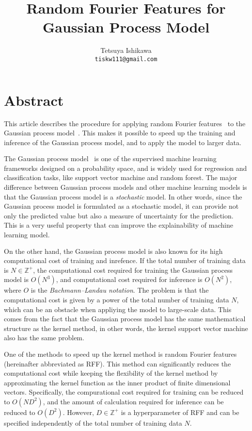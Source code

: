 \documentclass[twocolumn, a4paper, 10pt]{article}
\begin{document}
\title{Random Fourier Features for Gaussian Process Model}
\author{Tetsuya Ishikawa \\ \normalsize\texttt{tiskw111@gmail.com}}
\maketitle

\section*{Abstract}\titlebar

This article describes the procedure for applying random Fourier features~\cite{Rasmussen2006}
to the Gaussian process model~\cite{Rahimi2007}. This makes it possible to speed up the training
and inference of the Gaussian process model, and to apply the model to larger data.

The Gaussian process model~\cite{Rahimi2007} is one of the supervised machine learning frameworks
designed on a probability space, and is widely used for regression and classification tasks, like
support vector machine and random forest. The major difference between Gaussian process models and
other machine learning models is that the Gaussian process model is a \textit{stochastic} model.
In other words, since the Gaussian process model is formulated as a stochastic model,
it can provide not only the predicted value but also a measure of uncertainty for the prediction.
This is a very useful property that can improve the explainability of machine learning model.

On the other hand, the Gaussian process model is also known for its high computational cost
of training and inrefence. If the total number of training data is $N \in \mathbb{Z}^{+}$,
the computational cost required for training the Gaussian process model is $O(N^3)$, and
computational cost required for inference is $O(N^2)$, where $O$ is the
\textit{Bachmann–Landau notation}. The problem is that the computational cost is given by
a power of the total number of training data $N$, which can be an obstacle when appliying
the model to large-scale data. This comes from the fact that the Gaussian process model has
the same mathematical structure as the kernel method, in other words,
the kernel support vector machine also has the same problem.

One of the methods to speed up the kernel method is random Fourier features~\cite{Rasmussen2006}
(hereinafter abbreviated as RFF). This method can significantly reduces the computational cost
while keeping the flexibility of the kernel method by approximating the kernel function as the inner
product of finite dimensional vectors. Specifically, the compurational cost required for training
can be reduced to $O(N D^2)$, and the amount of calculation required for inference can be reduced
to $O(D^2)$. However, $D \in \mathbb{Z}^{+}$ is a hyperparameter of RFF and can be specified
independently of the total number of training data $N$.
\end{document}
